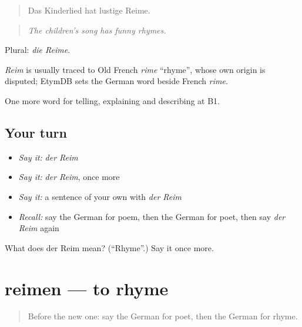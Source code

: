 \begin{quote}
Das Kinderlied hat lustige Reime.
\end{quote}

\begin{quote}
\emph{The children's song has funny rhymes.}
\end{quote}

Plural: \emph{die Reime}.

\begin{cousinweb}
\emph{Reim} is usually traced to Old French \emph{rime} \textquotedblleft{}rhyme\textquotedblright{}, whose own origin is disputed; EtymDB sets the German word beside French \emph{rime}.
\end{cousinweb}

\begin{grammarlens}[title={What you've built}]
One more word for telling, explaining and describing at B1.
\end{grammarlens}

\subsection*{Your turn}
\begin{itemize}
\raggedright
  \item \emph{Say it:} \emph{der Reim}
  \item \emph{Say it:} \emph{der Reim}, once more
  \item \emph{Say it:} a sentence of your own with \emph{der Reim}
  \item \emph{Recall:} say the German for poem, then the German for poet, then say \emph{der Reim} again
\end{itemize}

\begin{tcolorbox}[breakable,colback=teal!4,colframe=teal!35!black,title={Before you move on}]
What does der Reim mean? (\textquotedblleft{}Rhyme\textquotedblright{}.) Say it once more.
\end{tcolorbox}
\section[reimen]{reimen — to rhyme}

\label{lesson:GE-C521-reimen}



\begin{quote}
Before the new one: say the German for poet, then the German for rhyme.
\end{quote}

